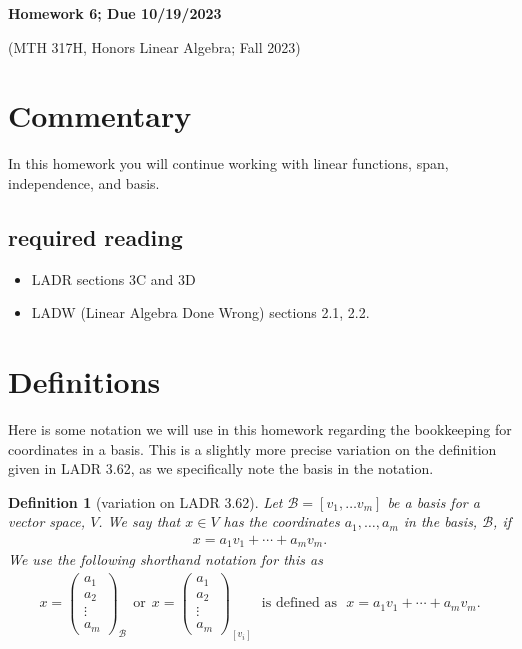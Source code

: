 \documentclass[12pt]{article}
\newtheorem{DEF}[thm]{Definition}
\def\B{\mathcal B}
\newcommand{\ColVecFour}[4]{\begin{pmatrix} #1\\ #2\\#3 \\ #4\end{pmatrix}}
\begin{document}
	\begin{LARGE}
	\begin{center}
		
		

		
	
	\textbf{Homework 6; Due 10/19/2023}
	

	(MTH 317H, Honors Linear Algebra;  Fall 2023)
	\end{center}
	\end{LARGE}
	\vspace{0.15in}
	
	
	


	
\section{Commentary}

In this homework you will continue working with linear functions, span, independence, and basis.



\subsection{required reading}

\begin{itemize}
	\item LADR sections 3C and 3D
	\item LADW (Linear Algebra Done Wrong) sections 2.1, 2.2.
\end{itemize}


\section{Definitions}\label{defs}
Here is some notation we will use in this homework regarding the bookkeeping for coordinates in a basis.  This is a slightly more precise variation on the definition given in LADR 3.62, as we specifically note the basis in the notation.

\begin{DEF}[variation on LADR 3.62]

Let $\B = [v_1, \dots v_m]$ be a basis for a vector space, $V$.  We say that $x\in V$ has the coordinates $a_1,\dots,a_m$ in the basis, $\B$, if 
\begin{align*}
	x = a_1 v_1 + \cdots + a_m v_m.
\end{align*}
We use the following shorthand notation for this as
\begin{align}\label{eq:Coordinates}
	x=\ColVecFour{a_1}{a_2}{\vdots}{a_m}_{\B}\ \ \text{or}\ \
	x=\ColVecFour{a_1}{a_2}{\vdots}{a_m}_{[v_i]} \ \ \ \text{is defined as}\ \ \
	x = a_1 v_1 + \cdots + a_m v_m.
\end{align}

\end{DEF}
\end{document}
